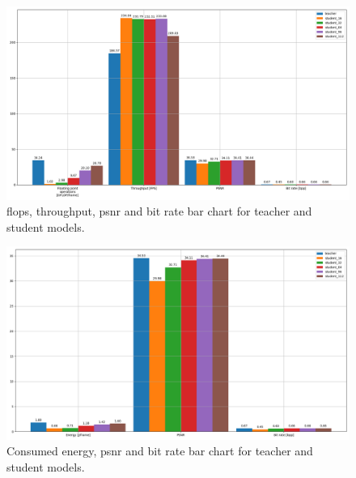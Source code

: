\begin{figure}
    \centering
    \includegraphics[width=15cm]{img/kd_lic_bar_compute.png}
    \caption[\acrshort{flop}s, throughput, \acrshort{psnr} and bit rate bar chart for teacher and student models.]{\acrshort{flop}s, throughput, \acrshort{psnr} and bit rate bar chart for teacher and student models.}
    \label{appendix:kd_lic_bar_compute}
\end{figure}

\begin{figure}
    \centering
    \includegraphics[width=15cm]{img/kd_lic_bar_energy.png}
    \caption[Consumed energy, \acrshort{psnr} and bit rate bar chart for teacher and student models.]{Consumed energy, \acrshort{psnr} and bit rate bar chart for teacher and student models.}
    \label{appendix:kd_lic_bar_energy}
\end{figure}

